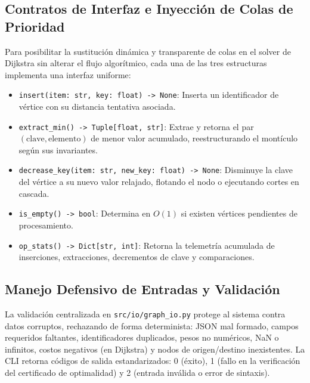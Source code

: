 \subsection{Contratos de Interfaz e Inyección de Colas de Prioridad}
Para posibilitar la sustitución dinámica y transparente de colas en el solver de Dijkstra sin alterar el flujo algorítmico, cada una de las tres estructuras implementa una interfaz uniforme:
\begin{itemize}
    \item \texttt{insert(item: str, key: float) -> None}: Inserta un identificador de vértice con su distancia tentativa asociada.
    \item \texttt{extract\_min() -> Tuple[float, str]}: Extrae y retorna el par $(\text{clave}, \text{elemento})$ de menor valor acumulado, reestructurando el montículo según sus invariantes.
    \item \texttt{decrease\_key(item: str, new\_key: float) -> None}: Disminuye la clave del vértice a su nuevo valor relajado, flotando el nodo o ejecutando cortes en cascada.
    \item \texttt{is\_empty() -> bool}: Determina en $O(1)$ si existen vértices pendientes de procesamiento.
    \item \texttt{op\_stats() -> Dict[str, int]}: Retorna la telemetría acumulada de inserciones, extracciones, decrementos de clave y comparaciones.
\end{itemize}

\subsection{Manejo Defensivo de Entradas y Validación}
La validación centralizada en \texttt{src/io/graph\_io.py} protege al sistema contra datos corruptos, rechazando de forma determinista: JSON mal formado, campos requeridos faltantes, identificadores duplicados, pesos no numéricos, NaN o infinitos, costos negativos (en Dijkstra) y nodos de origen/destino inexistentes. La CLI retorna códigos de salida estandarizados: 0 (éxito), 1 (fallo en la verificación del certificado de optimalidad) y 2 (entrada inválida o error de sintaxis).

